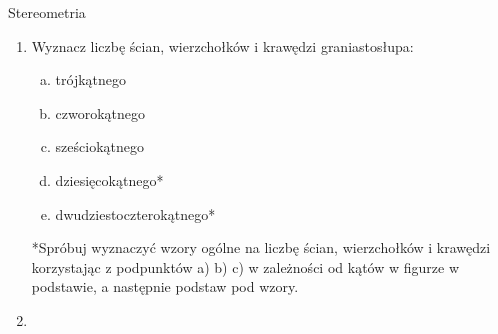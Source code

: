 \documentclass[12pt,a4paper]{article}
\begin{document}
	\begin{center}
		\LARGE Stereometria
	\end{center}
	\vspace{1cm}
	
	
	\begin{enumerate}[1.]
		\item Wyznacz liczbę ścian, wierzchołków i krawędzi graniastosłupa:
		\begin{enumerate}[a)]
			\item trójkątnego
			\item czworokątnego
			\item sześciokątnego
			\item dziesięcokątnego*
			\item dwudziestoczterokątnego*
		\end{enumerate}
		
		*Spróbuj wyznaczyć wzory ogólne na liczbę ścian, wierzchołków i krawędzi korzystając z podpunktów a) b) c) w zależności od kątów w figurze w podstawie, a następnie podstaw pod wzory.
		
		\item 
	\end{enumerate}
\end{document}

